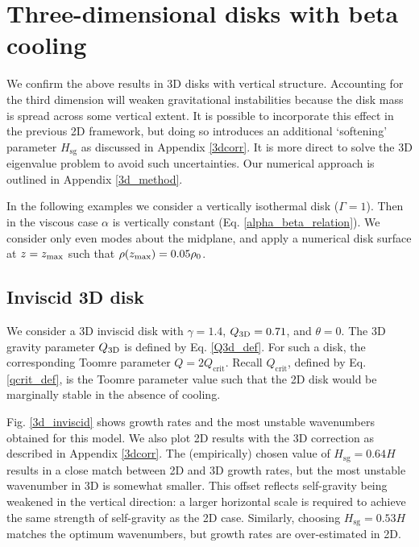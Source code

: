 \section{Three-dimensional disks with beta cooling}\label{3ddisk}
We confirm the above results in 3D disks with vertical
structure. Accounting for the third dimension will weaken gravitational instabilities
because the disk mass is spread across some vertical extent. It is 
possible to incorporate this effect in the previous 2D framework, but doing so
introduces an additional `softening' parameter $H_\mathrm{sg}$ as discussed in
Appendix \ref{3dcorr}. It is more direct to solve the 3D eigenvalue
problem to avoid such uncertainties. Our numerical approach is
outlined in Appendix \ref{3d_method}. 


In the following examples we consider a vertically isothermal disk
($\Gamma=1$). Then in the viscous case $\alpha$ is vertically
constant (Eq. \ref{alpha_beta_relation}). We consider only even modes
about the midplane, and apply a numerical disk surface at $z=z_\mathrm{max}$
such that $\rho(z_\mathrm{max})=0.05\rho_0$.     

\subsection{Inviscid 3D disk}

We consider a 3D inviscid disk with $\gamma=1.4$, $Q_\mathrm{3D}=0.71$, and $\theta=0$. 
The 3D gravity parameter $Q_\mathrm{3D}$ is defined by 
Eq. \ref{Q3d_def}. For such a disk, the corresponding Toomre parameter 
$Q=2Q_\mathrm{crit}$. Recall $Q_\mathrm{crit}$, defined by
Eq. \ref{qcrit_def}, is the Toomre parameter value such that the 2D
disk would be marginally stable in the absence of cooling. 

Fig. \ref{3d_inviscid} shows growth rates and the most unstable
wavenumbers obtained for this model. We also plot 2D
results with the 3D correction as described in Appendix
\ref{3dcorr}. The (empirically) chosen value of 
$H_\mathrm{sg}=0.64H$ results in a close match between 2D and 3D
growth rates, but the most unstable wavenumber in 3D is somewhat smaller. 
This offset reflects self-gravity being weakened in the vertical 
direction: a larger horizontal scale is required to achieve the same
strength of self-gravity as the 2D case. Similarly, 
choosing $H_\mathrm{sg}=0.53H$ matches the optimum wavenumbers, but
growth rates are over-estimated in 2D.    

